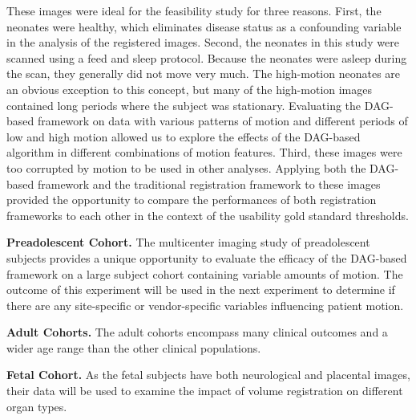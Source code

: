 These images were ideal for the feasibility study for three reasons. First, the neonates were healthy, which eliminates disease status as a confounding variable in the analysis of the registered images. Second, the neonates in this study were scanned using a feed and sleep protocol. Because the neonates were asleep during the scan, they generally did not move very much. The high-motion neonates are an obvious exception to this concept, but many of the high-motion images contained long periods where the subject was stationary. Evaluating the DAG-based framework on data with various patterns of motion and different periods of low and high motion allowed us to explore the effects of the DAG-based algorithm in different combinations of motion features. Third, these images were too corrupted by motion to be used in other analyses. Applying both the DAG-based framework and the traditional registration framework to these images provided the opportunity to compare the performances of both registration frameworks to each other in the context of the usability gold standard thresholds. 

\textbf{Preadolescent Cohort.} The multicenter imaging study of preadolescent subjects provides a unique opportunity to evaluate the efficacy of the DAG-based framework on a large subject cohort containing variable amounts of motion. The outcome of this experiment will be used in the next experiment to determine if there are any site-specific or vendor-specific variables influencing patient motion.

\textbf{Adult Cohorts.} The adult cohorts encompass many clinical outcomes and a wider age range than the other clinical populations. 

\textbf{Fetal Cohort.} As the fetal subjects have both neurological and placental images, their data will be used to examine the impact of volume registration on different organ types.
